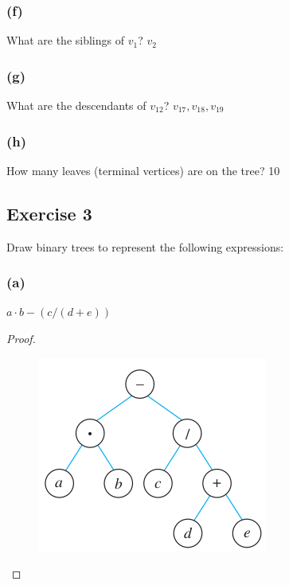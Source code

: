 \documentclass[14pt]{extarticle}
\begin{document}
\subsubsection{(f)}
What are the siblings of \(v_1\)?
\hspace{2cm}{\it Proof.} \(v_2\)

\subsubsection{(g)}
What are the descendants of \(v_{12}\)?
\hspace{2cm}{\it Proof.} \(v_{17}, v_{18}, v_{19}\)

\subsubsection{(h)}
How many leaves (terminal vertices) are on the tree?
\hspace{2cm}{\it Proof.} 10

\subsection{Exercise 3}
Draw binary trees to represent the following expressions:

\subsubsection{(a)}
\(a \cdot b - (c/(d + e))\)

\begin{proof}
\begin{figure}[ht!]
\centering
\includegraphics[scale=0.6]{../images/10.5.3.a.png}
\end{figure}
\end{proof}
\end{document}
